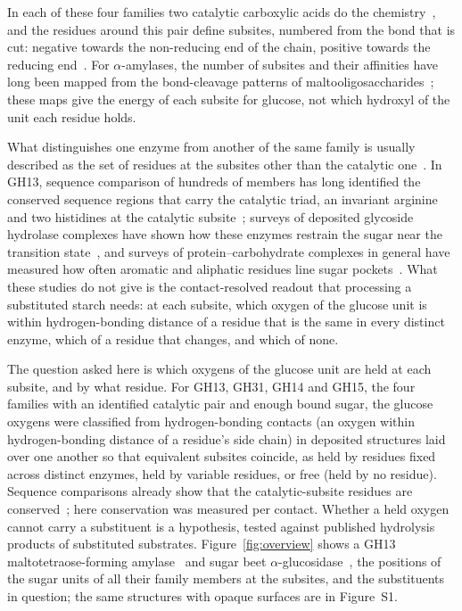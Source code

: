 \documentclass[preprint,12pt]{elsarticle}
\begin{document}
In each of these four families two catalytic carboxylic acids do the
chemistry~\citep{Davies1995}, and the residues around this pair define subsites, numbered from the bond that is cut: negative towards
the non-reducing end of the chain, positive towards the reducing end~\citep{Davies1997}. For $\alpha$-amylases, the
number of subsites and their affinities have long been mapped from the bond-cleavage patterns of
maltooligosaccharides~\citep{Robyt1970,Ajandouz1992,Kandra2003}; these maps give the energy of each subsite for
glucose, not which hydroxyl of the unit each residue holds.

What distinguishes one enzyme from another of the same family is usually described as the set of residues at the
subsites other than the catalytic one~\citep{Davies1995}. In GH13, sequence comparison of hundreds of members has
long identified the conserved sequence regions that carry the catalytic triad, an invariant arginine and two
histidines at the catalytic subsite~\citep{MacGregor2001,Janecek2014}; surveys of deposited glycoside hydrolase
complexes have shown how these enzymes restrain the sugar near the transition state~\citep{Quirke2020}, and surveys
of protein--carbohydrate complexes in general have measured how often aromatic and aliphatic residues line sugar
pockets~\citep{Hudson2015}. What these studies do not give is the contact-resolved readout that processing a
substituted starch needs: at each subsite, which oxygen of the glucose unit is within hydrogen-bonding distance of a
residue that is the same in every distinct enzyme, which of a residue that changes, and which of none.

The question asked here is which oxygens of the glucose unit are held at each subsite, and by what residue. For
GH13, GH31, GH14 and GH15, the four families with an identified catalytic pair and enough bound sugar, the glucose
oxygens were classified from hydrogen-bonding contacts (an oxygen within hydrogen-bonding distance of a residue's side chain) in deposited structures laid over one another so that equivalent subsites coincide, as held by residues fixed
across distinct enzymes, held by variable residues, or free (held by no residue). Sequence comparisons already show that the catalytic-subsite residues are conserved~\citep{MacGregor2001}; here conservation was measured per contact. Whether a held oxygen cannot carry
a substituent is a hypothesis, tested against published hydrolysis products of substituted substrates.
Figure~\ref{fig:overview} shows a GH13 maltotetraose-forming amylase~\citep{Zhang2020} and sugar beet
$\alpha$-glucosidase~\citep{Tagami2015}, the positions of the sugar units of all their family members at the subsites,
and the substituents in question; the same structures with opaque surfaces are in Figure~S1.
\end{document}

